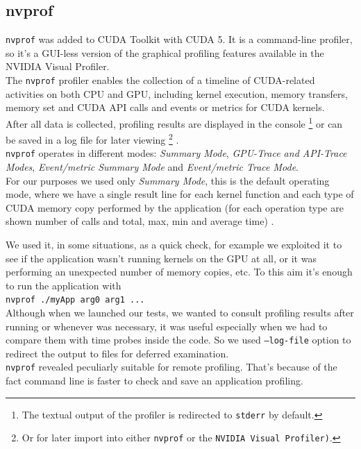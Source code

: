 	
	\subsection{nvprof}
	\texttt{nvprof} was added to CUDA Toolkit with CUDA 5. It is a command-line profiler, so it's a GUI-less version of the graphical profiling features available in the NVIDIA Visual Profiler.\\
	The \texttt{nvprof} profiler enables the collection of a timeline of CUDA-related activities on both CPU and GPU, including kernel execution, memory transfers, memory set and CUDA API calls and events or metrics for CUDA kernels.\\
	After all data is collected, profiling results are displayed in the console \footnote{The textual output of the profiler is redirected to \texttt{stderr} by default.} or can be saved in a log file for later viewing \footnote{Or for later import into either \texttt{nvprof} or the \texttt{NVIDIA Visual Profiler)}.} \cite{profilersguide, nvprofarticle}.\\
	\texttt{nvprof} operates in different modes: \textit{Summary Mode}, \textit{GPU-Trace and API-Trace Modes}, \textit{Event/metric Summary Mode} and  \textit{Event/metric Trace Mode}.\\	
	For our purposes we used only \textit{Summary Mode}, this is the default operating mode, where we have a single result line for each kernel function and each type of CUDA memory copy performed by the application (for each operation type are shown number of calls and total, max, min and average time) \cite{profilersguide}.
	
	We used it, in some situations, as a quick check, for example we exploited it to see if the application wasn't running kernels on the GPU at all, or it was performing an unexpected number of memory copies, etc.
	To this aim it's enough to run the application with\\
	\texttt{nvprof ./myApp arg0 arg1 ...}\\
	Although when we launched our tests, we wanted to consult profiling results after running or whenever was necessary, it was useful especially when we had to compare them with time probes inside the code. So we used \texttt{--log-file} option to redirect the output to files for deferred examination. \\
	\texttt{nvprof} revealed peculiarly suitable for remote profiling. That's because of the fact command line is faster to check and save an application profiling.
	  

